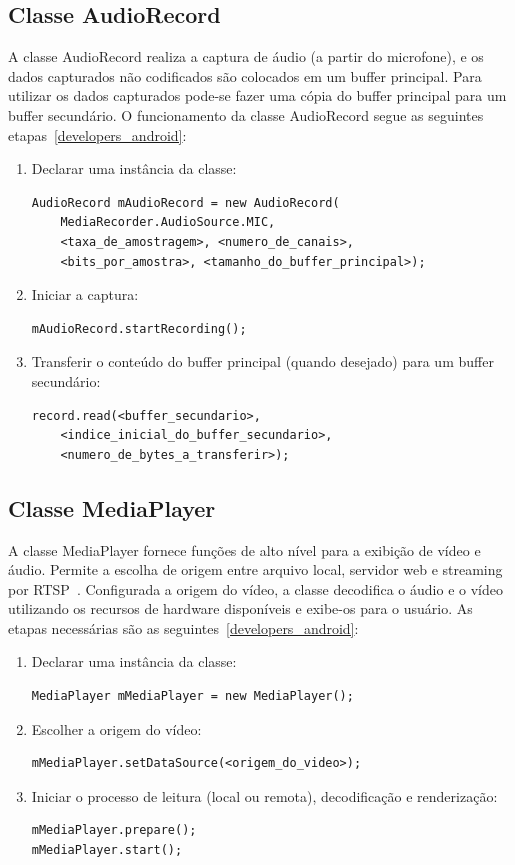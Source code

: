 \documentclass{acm_proc_article-sp}
\begin{document}
\subsection{Classe AudioRecord}
A classe AudioRecord realiza a captura de áudio (a partir do microfone), e os dados capturados não codificados são colocados em um buffer principal. Para utilizar os dados capturados pode-se fazer uma cópia do buffer principal para um buffer secundário. O funcionamento da classe AudioRecord segue as seguintes etapas~\ref{developers_android}:
\begin{enumerate}
 \item Declarar uma instância da classe:
  \begin{lstlisting}
AudioRecord mAudioRecord = new AudioRecord(
    MediaRecorder.AudioSource.MIC, 
    <taxa_de_amostragem>, <numero_de_canais>,
    <bits_por_amostra>, <tamanho_do_buffer_principal>);
  \end{lstlisting}
 \item Iniciar a captura:
  \begin{lstlisting}
mAudioRecord.startRecording();
  \end{lstlisting}
 \item Transferir o conteúdo do buffer principal (quando desejado) para um buffer secundário:
  \begin{lstlisting}
record.read(<buffer_secundario>,
    <indice_inicial_do_buffer_secundario>,
    <numero_de_bytes_a_transferir>);
  \end{lstlisting}
\end{enumerate}

\subsection{Classe MediaPlayer}
A classe MediaPlayer fornece funções de alto nível para a exibição de vídeo e áudio. Permite a escolha de origem entre arquivo local, servidor web e streaming por RTSP~\cite{pro_android}. Configurada a origem do vídeo, a classe decodifica o áudio e o vídeo utilizando os recursos de hardware disponíveis e exibe-os para o usuário. As etapas necessárias são as seguintes~\ref{developers_android}:
\begin{enumerate}
 \item Declarar uma instância da classe:
  \begin{lstlisting}
MediaPlayer mMediaPlayer = new MediaPlayer();
  \end{lstlisting}
 \item Escolher a origem do vídeo:
  \begin{lstlisting}
mMediaPlayer.setDataSource(<origem_do_video>);
  \end{lstlisting}
 \item Iniciar o processo de leitura (local ou remota), decodificação e renderização:
  \begin{lstlisting}
mMediaPlayer.prepare();
mMediaPlayer.start();
  \end{lstlisting}
\end{enumerate}
\end{document}
